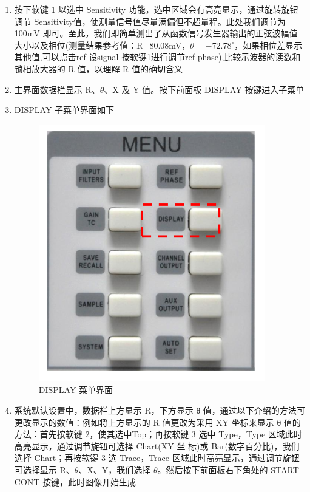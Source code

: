 \documentclass[11pt,a4paper]{ctexart}
\begin{document}
\begin{enumerate}[(1)]
		\item 按下软键 1 以选中 Sensitivity 功能，选中区域会有高亮显示，通过旋转旋钮调节 Sensitivity值，使测量信号值尽量满偏但不超量程。此处我们调节为 100mV 即可。至此，我们即简单测出了从函数信号发生器输出的正弦波幅值大小以及相位(测量结果参考值：R=80.08mV，$\theta=-72.78^\circ$，如果相位差显示其他值,可以点击ref 设signal 按软键1进行调节ref phase),比较示波器的读数和锁相放大器的 R 值，以理解 R 值的确切含义
		
		\item 主界面数据栏显示 R、$\theta$、X 及 Y 值。按下前面板 DISPLAY 按键进入子菜单
		\item DISPLAY 子菜单界面如下
		\begin{figure}[H]
			\centering
			\includegraphics[scale=0.5]{D1-16}
			\caption{DISPLAY 菜单界面}\label{D1-16}
		\end{figure}
	
		\item 系统默认设置中，数据栏上方显示 R，下方显示 θ 值，通过以下介绍的方法可更改显示的数值：例如将上方显示的 R 值更改为采用 XY 坐标来显示 θ 值的方法：首先按软键 2，使其选中Top；再按软键 3 选中 Type，Type 区域此时高亮显示，通过调节旋钮可选择 Chart(XY 坐 标)或 Bar(数字百分比)，我们选择 Chart；再按软键 3 选 Trace，Trace 区域此时高亮显示，通过调节旋钮可选择显示 R、$\theta$、X、Y，我们选择 $\theta$。然后按下前面板右下角处的 START CONT 按键，此时图像开始生成
		

\end{enumerate}
\end{document}
